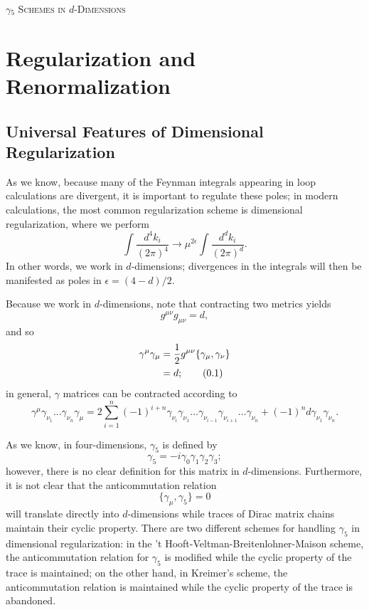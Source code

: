 \documentclass[12pt]{article}
\numberwithin{equation}{section}
\numberwithin{figure}{section}
\numberwithin{table}{section}
\newcommand{\numberthis}{\addtocounter{equation}{1}\tag{\theequation}}
\renewcommand{\theequation}{\arabic{section}.\arabic{equation}}
\begin{document}
	\begin{center}
		{\Huge \scshape \(\gamma_5\) Schemes in \(d\)-Dimensions}
	\end{center}
	
	\vspace{0.5cm}
	
	\section{Regularization and Renormalization}
	
	\subsection{Universal Features of Dimensional Regularization}
	
	As we know, because many of the Feynman integrals appearing in loop calculations are divergent, it is important to regulate these poles; in modern calculations, the most common regularization scheme is dimensional regularization, where we perform  
	\begin{equation}
	\int\frac{d^4k_i}{(2\pi)^4}\rightarrow\mu^{2\epsilon}\int\frac{d^dk_i}{(2\pi)^d}.
	\end{equation}
	In other words, we work in \(d\)-dimensions; divergences in the integrals will then be manifested as poles in \(\epsilon=(4-d)/2\). 
	
	Because we work in \(d\)-dimensions, note that contracting two metrics yields  
	\begin{equation}
	g^{\mu\nu}g_{\mu\nu}=d,
	\end{equation}
	and so 
	\begin{align*}
	\gamma^\mu\gamma_\mu & =\frac{1}{2}g^{\mu\nu}\{\gamma_\mu,\gamma_\nu\}\\
	& =d; \numberthis
	\end{align*}
	in general, \(\gamma\) matrices can be contracted according to  
	\begin{equation}
	\gamma^\mu\gamma_{\nu_1}\dots\gamma_{\nu_n}\gamma_\mu=2\sum_{i=1}^n(-1)^{i+n}\gamma_{\nu_i}\gamma_{\nu_1}\dots\gamma_{\nu_{i-1}}\gamma_{\nu_{i+1}}\dots\gamma_{\nu_n}+(-1)^{n}d\gamma_{\nu_1}\gamma_{\nu_n}.
	\end{equation}
	
	As we know, in four-dimensions, \(\gamma_5\) is defined by  
	\begin{equation}
	\gamma_5=-i\gamma_0\gamma_1\gamma_2\gamma_3;
	\end{equation}
	however, there is no clear definition for this matrix in \(d\)-dimensions. Furthermore, it is not clear that the anticommutation relation  
	\begin{equation}
	\{\gamma_\mu,\gamma_5\}=0
	\end{equation}
	will translate directly into \(d\)-dimensions while traces of Dirac matrix chains maintain their cyclic property. There are two different schemes for handling \(\gamma_5\) in dimensional regularization: in the 't Hooft-Veltman-Breitenlohner-Maison scheme, the anticommutation relation for \(\gamma_5\) is modified while the cyclic property of the trace is maintained; on the other hand, in Kreimer's scheme, the anticommutation relation is maintained while the cyclic property of the trace is abandoned. 
	
\end{document}
